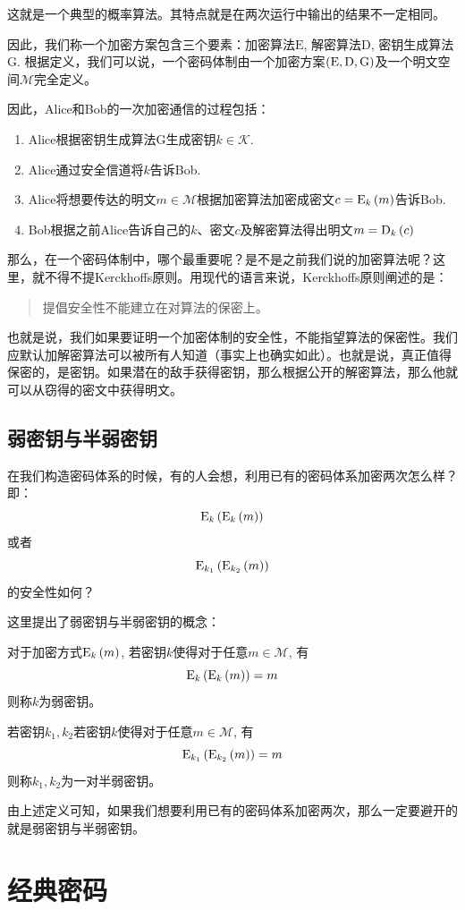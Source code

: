 这就是一个典型的概率算法。其特点就是在两次运行中输出的结果不一定相同。\par
因此，我们称一个加密方案包含三个要素：加密算法$\mathrm{E}$, 解密算法$\mathrm{D}$, 密钥生成算法$\mathrm{G}$. 根据定义，我们可以说，一个密码体制由一个加密方案$\left( {\mathrm{E}, \mathrm{D}, \mathrm{G}}\right)$及一个明文空间$\mathcal{M}$完全定义。\par
因此，Alice和Bob的一次加密通信的过程包括：
\begin{enumerate}
    \item Alice根据密钥生成算法$\mathrm{G}$生成密钥$k\in\mathcal{K}$.
    \item Alice通过安全信道将$k$告诉Bob.
    \item Alice将想要传达的明文$m\in\mathcal{M}$根据加密算法加密成密文$c={\mathrm{E}_{k}\left({m}\right)}$告诉Bob.
    \item Bob根据之前Alice告诉自己的$k$、密文$c$及解密算法得出明文$m={\mathrm{D}_{k}\left({c}\right)}$
\end{enumerate}

那么，在一个密码体制中，哪个最重要呢？是不是之前我们说的加密算法呢？这里，就不得不提Kerckhoffs原则。用现代的语言来说，Kerckhoffs原则阐述的是：
\begin{quote}
    提倡安全性不能建立在对算法的保密上。
\end{quote}

也就是说，我们如果要证明一个加密体制的安全性，不能指望算法的保密性。我们应默认加解密算法可以被所有人知道（事实上也确实如此）。也就是说，真正值得保密的，是密钥。如果潜在的敌手获得密钥，那么根据公开的解密算法，那么他就可以从窃得的密文中获得明文。
\subsection{弱密钥与半弱密钥}
在我们构造密码体系的时候，有的人会想，利用已有的密码体系加密两次怎么样？即：
\[{\mathrm{E}_{k}\left({{\mathrm{E}_{k}\left({m}\right)}}\right)}\]
或者
\[{\mathrm{E}_{k_1}\left({{\mathrm{E}_{k_2}\left({m}\right)}}\right)}\]
的安全性如何？\par
这里提出了弱密钥与半弱密钥的概念：
\begin{Definition}
对于加密方式${\mathrm{E}_{k}\left({m}\right)}$, 若密钥$k$使得对于任意$m\in\mathcal{M}$, 有
\[{\mathrm{E}_{k}\left({{\mathrm{E}_{k}\left({m}\right)}}\right)}=m\]
则称$k$为弱密钥。\par
若密钥$k_1, k_2$若密钥$k$使得对于任意$m\in\mathcal{M}$, 有
\[{\mathrm{E}_{k_1}\left({{\mathrm{E}_{k_2}\left({m}\right)}}\right)}=m\]
则称$k_1, k_2$为一对半弱密钥。
\end{Definition}

由上述定义可知，如果我们想要利用已有的密码体系加密两次，那么一定要避开的就是弱密钥与半弱密钥。
\section{经典密码}
